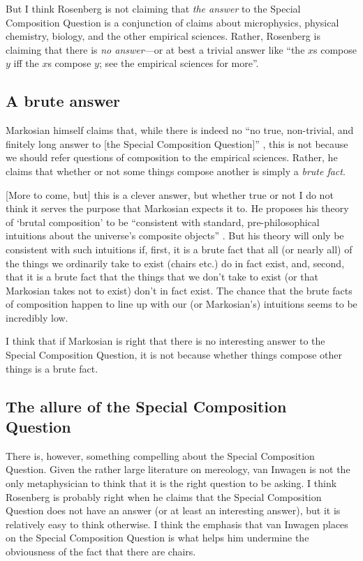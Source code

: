 \documentclass[11pt]{article}
\begin{document}
\begin{spacing}{1.5}
But I think Rosenberg is not claiming that {\em the answer} to the
Special Composition Question is a conjunction of claims about
microphysics, physical chemistry, biology, and the other empirical
sciences.  Rather, Rosenberg is claiming that there is {\em no
  answer}---or at best a trivial answer like ``the $x$s compose $y$
iff the $x$s compose $y$; see the empirical sciences for more''.

\subsection{A brute answer}
Markosian himself claims that, while there is indeed no ``no true,
non-trivial, and finitely long answer to [the Special Composition
  Question]'' \citeyearpar[214]{markosian1998a}, this is not because
we should refer questions of composition to the empirical sciences.
Rather, he claims that whether or not some things compose another is
simply a {\em brute fact}.

[More to come, but] this is a clever answer, but whether true or not I
do not think it serves the purpose that Markosian expects it to.  He
proposes his theory of `brutal composition' to be ``consistent with
standard, pre-philosophical intuitions about the universe's composite
objects'' \citeyearpar[211]{markosian1998a}.  But his theory will only
be consistent with such intuitions if, first, it is a brute fact that
all (or nearly all) of the things we ordinarily take to exist (chairs
etc.) do in fact exist, and, second, that it is a brute fact that the
things that we don't take to exist (or that Markosian takes not to
exist) don't in fact exist.  The chance that the brute facts of
composition happen to line up with our (or Markosian's) intuitions
seems to be incredibly low.

I think that if Markosian is right that there is no interesting answer
to the Special Composition Question, it is not because whether things
compose other things is a brute fact.

\subsection{The allure of the Special Composition Question}
There is, however, something compelling about the Special Composition
Question.  Given the rather large literature on mereology, van Inwagen
is not the only metaphysician to think that it is the right question
to be asking.  I think Rosenberg is probably right when he claims that
the Special Composition Question does not have an answer (or at least
an interesting answer), but it is relatively easy to think otherwise.
I think the emphasis that van Inwagen places on the Special
Composition Question is what helps him undermine the obviousness of
the fact that there are chairs.


\end{spacing}
\end{document}
